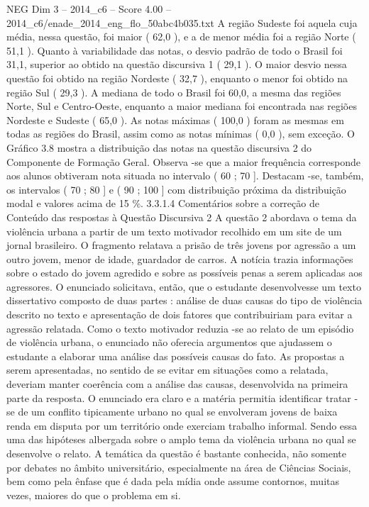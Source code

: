 \begin{textsample}{NEG Dim 3 – 2014\_c6 – Score 4.00 – 2014\_c6/enade\_2014\_eng\_flo\_50abc4b035.txt}
A região Sudeste foi aquela cuja média, nessa questão, foi maior ( 62,0 ), e a de menor média foi a região Norte ( 51,1 ).
Quanto à variabilidade das notas, o desvio padrão de todo o Brasil foi 31,1, superior ao obtido na questão discursiva 1 ( 29,1 ).
O maior desvio nessa questão foi obtido na região Nordeste ( 32,7 ), enquanto o menor foi obtido na região Sul ( 29,3 ).
A mediana de todo o Brasil foi 60,0, a mesma das regiões Norte, Sul e Centro-Oeste, enquanto a maior mediana foi encontrada nas regiões Nordeste e Sudeste ( 65,0 ).
As notas máximas ( 100,0 ) foram as mesmas em todas as regiões do Brasil, assim como as notas mínimas ( 0,0 ), sem exceção.
O Gráfico 3.8 mostra a distribuição das notas na questão discursiva 2 do Componente de Formação Geral.
Observa -se que a maior frequência corresponde aos alunos obtiveram nota situada no intervalo ( 60 ; 70 ].
Destacam -se, também, os intervalos ( 70 ; 80 ] e ( 90 ; 100 ] com distribuição próxima da distribuição modal e valores acima de 15 \%. 3.3.1.4 Comentários sobre a correção de Conteúdo das respostas à Questão Discursiva 2 A questão 2 abordava o tema da violência urbana a partir de um texto motivador recolhido em um site de um jornal brasileiro.
O fragmento relatava a prisão de três jovens por agressão a um outro jovem, menor de idade, guardador de carros.
A notícia trazia informações sobre o estado do jovem agredido e sobre as possíveis penas a serem aplicadas aos agressores.
O enunciado solicitava, então, que o estudante desenvolvesse um texto dissertativo composto de duas partes : análise de duas causas do tipo de violência descrito no texto e apresentação de dois fatores que contribuiriam para evitar a agressão relatada.
Como o texto motivador reduzia -se ao relato de um episódio de violência urbana, o enunciado não oferecia argumentos que ajudassem o estudante a elaborar uma análise das possíveis causas do fato.
As propostas a serem apresentadas, no sentido de se evitar em situações como a relatada, deveriam manter coerência com a análise das causas, desenvolvida na primeira parte da resposta.
O enunciado era claro e a matéria permitia identificar tratar -se de um conflito tipicamente urbano no qual se envolveram jovens de baixa renda em disputa por um território onde exerciam trabalho informal.
Sendo essa uma das hipóteses albergada sobre o amplo tema da violência urbana no qual se desenvolve o relato.
A temática da questão é bastante conhecida, não somente por debates no âmbito universitário, especialmente na área de Ciências Sociais, bem como pela ênfase que é dada pela mídia onde assume contornos, muitas vezes, maiores do que o problema em si.

\end{textsample}
